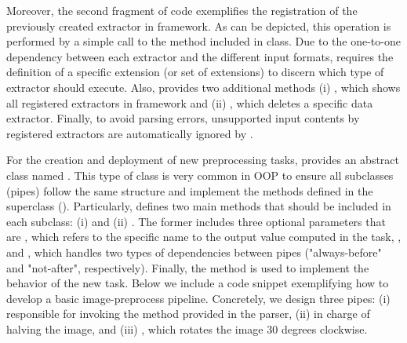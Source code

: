 Moreover, the second fragment of code exemplifies the registration of the previously created extractor in  framework. As can be depicted, this operation is performed by a simple call to the  method included in  class. Due to the one-to-one dependency between each extractor and the different input formats,  requires the definition of a specific extension (or set of extensions) to discern which type of extractor should execute. Also,  provides two additional methods (i) , which shows all registered extractors in  framework and (ii) , which deletes a specific data extractor. Finally, to avoid parsing errors, unsupported input contents by registered extractors are automatically ignored by .

For the creation and deployment of new preprocessing tasks,  provides an abstract class named . This type of class is very common in OOP to ensure all subclasses (pipes) follow the same structure and implement the methods defined in the superclass (). Particularly,  defines two main methods that should be included in each subclass: (i)  and (ii) . The former includes three optional parameters that are , which refers to the specific name to the output value computed in the task, , and , which handles two types of dependencies between pipes ("always-before" and "not-after", respectively). Finally, the  method is used to implement the behavior of the new task. Below we include a code snippet exemplifying how to develop a basic image-preprocess pipeline. Concretely, we design three pipes: (i)  responsible for invoking the  method provided in the  parser, (ii)  in charge of halving the image, and (iii) , which rotates the image 30 degrees clockwise.

